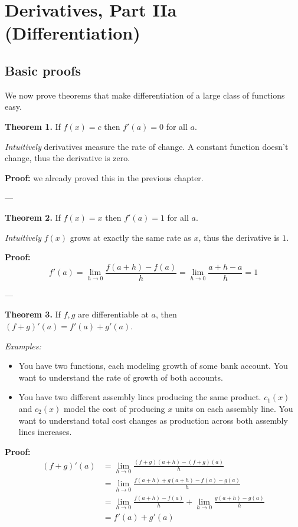 
\section{Derivatives, Part IIa (Differentiation)}

\subsection{Basic proofs}

We now prove theorems that make differentiation of a large class of
functions easy.

\vs

\textbf{Theorem 1.} If $f(x)=c$ then $f'(a)=0$ for all $a$.

\vs

\textit{Intuitively} derivatives measure the rate of change. A
constant function doesn't change, thus the derivative is zero.

\vs

\textbf{Proof:} we already proved this in the previous chapter.

\vs---\vs

\textbf{Theorem 2.} If $f(x)=x$ then $f'(a)=1$ for all $a$.

\vs

\textit{Intuitively} $f(x)$ grows at exactly the same rate as $x$,
thus the derivative is $1$.

\vs

\textbf{Proof:}
\[f'(a)=\lim_{h\to0}\frac{f(a+h)-f(a)}{h}=\lim_{h\to0}\frac{a+h-a}{h}=1\]

\vs---\vs

\textbf{Theorem 3.} If $f,g$ are differentiable at $a$, then
$(f+g)'(a)=f'(a)+g'(a)$.

\vs
\textit{Examples:}
\begin{itemize}
\item You have two functions, each modeling growth of some bank
  account. You want to understand the rate of growth of both accounts.
\item You have two different assembly lines producing the same
  product. $c_1(x)$ and $c_2(x)$ model the cost of producing $x$
  units on each assembly line. You want to understand total cost
  changes as production across both assembly lines increases.
\end{itemize}

\textbf{Proof:}
\begin{align*}
  (f+g)'(a)&=\lim_{h\to0}\frac{(f+g)(a+h)-(f+g)(a)}{h}\\
           &=\lim_{h\to0}\frac{f(a+h)+g(a+h)-f(a)-g(a)}{h}\\
           &=\lim_{h\to0}\frac{f(a+h)-f(a)}{h} +
             \lim_{h\to0}\frac{g(a+h)-g(a)}{h}\\
           &=f'(a)+g'(a)
\end{align*}

